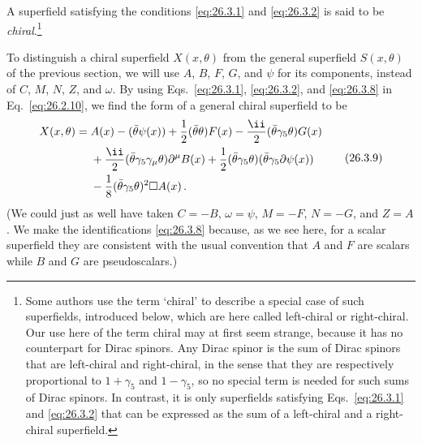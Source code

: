 A superfield satisfying the conditions \eqref{eq:26.3.1} and
\eqref{eq:26.3.2} is said to be
\emph{chiral}.\footnote{Some authors use the term `chiral' to describe a
special case of such superfields, introduced below, which are here called
left-chiral or right-chiral. Our use here of the term chiral may at first seem
strange, because it has no counterpart for Dirac spinors. Any Dirac spinor is
the sum of Dirac spinors that are left-chiral and right-chiral, in the sense
that they are respectively proportional to $1+\gamma_5$ and $1-\gamma_5$, so
no special term is needed for such sums of Dirac spinors. In contrast, it is
only superfields satisfying Eqs.~\eqref{eq:26.3.1} and \eqref{eq:26.3.2} that
can be expressed as the sum of a left-chiral and a right-chiral superfield.}

To distinguish a chiral superfield $X(x,\theta)$ from the general superfield
$S(x,\theta)$ of the previous section, we will use $A$, $B$, $F$, $G$, and
$\psi$ for its components, instead of $C$, $M$, $N$, $Z$, and $\omega$. By
using Eqs.~\eqref{eq:26.3.1}, \eqref{eq:26.3.2}, and \eqref{eq:26.3.8} in
Eq.~\eqref{eq:26.2.10}, we find the form of a general chiral superfield to be
\begin{equation}
  \begin{aligned}
  X(x,\theta)={}&A(x)-(\bar\theta\psi(x))
  +\frac12(\bar\theta\theta)F(x)
  -\frac{\ii}{2}(\bar\theta\gamma_5\theta)G(x)
  \\
  &+\frac{\ii}{2}(\bar\theta\gamma_5\gamma_\mu\theta)
    \partial^\mu B(x)
  +\frac12(\bar\theta\gamma_5\theta)
    (\bar\theta\gamma_5\sl{\partial}\psi(x))
  \\
  &-\frac18(\bar\theta\gamma_5\theta)^2\Box A(x)\,.
  \end{aligned}
  \tag{26.3.9}\label{eq:26.3.9}
\end{equation}
(We could just as well have taken $C=-B$, $\omega=\psi$, $M=-F$, $N=-G$,
and $Z=A$. We make the identifications \eqref{eq:26.3.8} because, as we see
here, for a scalar superfield they are consistent with the usual convention
that $A$ and $F$ are scalars while $B$ and $G$ are pseudoscalars.)


